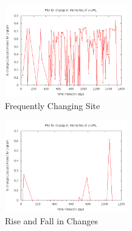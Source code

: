\documentclass{article}
\begin{document}
\begin{center}
\begin{figure}[ht]
    \centering
    \includegraphics[width=0.475\textwidth,natwidth=700,natheight=700]{choosen_20_20.png}
    \caption{Frequently Changing Site}
    \label{fig:choosen_20_20.png}
\end{figure}
\end{center}

\begin{center}
\begin{figure}[ht]
    \centering
    \includegraphics[width=0.475\textwidth,natwidth=700,natheight=700]{choosen_20_15.png}
    \caption{Rise and Fall in Changes}
    \label{fig:choosen_20_15.png}
\end{figure}
\end{center}

\clearpage

\end{document}
